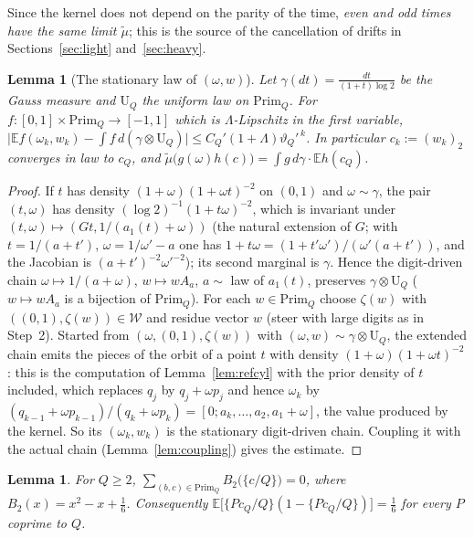\documentclass[11pt]{amsart}
\newtheorem{lemma}[theorem]{Lemma}
\theoremstyle{definition}
\numberwithin{equation}{section}
\newcommand{\E}{\mathbb{E}}
\newcommand{\cW}{\mathcal{W}}
\newcommand{\fr}[1]{\{#1\}}
\newcommand{\Prim}{\mathrm{Prim}}
\begin{document}
Since the kernel does not depend on the parity of the time, \emph{even and odd times have the same limit $\tilde\mu$}; this is the source of
the cancellation of drifts in Sections~\ref{sec:light} and~\ref{sec:heavy}.

\begin{lemma}[The stationary law of $(\omega,w)$]\label{lem:statlaw}
Let $\gamma(dt)=\frac{dt}{(1+t)\log2}$ be the Gauss measure and $\mathrm U_Q$ the uniform law on $\Prim_Q$. For $f:[0,1]\times\Prim_Q\to[-1,1]$
which is $\Lambda$-Lipschitz in the first variable,
$\big|\E f(\omega_k,w_k)-\int f\,d(\gamma\otimes\mathrm U_Q)\big|\le C_Q'(1+\Lambda)\vartheta_Q'^{\,k}$. In particular $c_k:=(w_k)_2$ converges in law to
$c_Q$, and $\tilde\mu\big(g(\omega)h(c)\big)=\int g\,d\gamma\cdot\E h(c_Q)$.
\end{lemma}

\begin{proof}
If $t$ has density $(1+\omega)(1+\omega t)^{-2}$ on $(0,1)$ and $\omega\sim\gamma$, the pair $(t,\omega)$ has density
$(\log2)^{-1}(1+t\omega)^{-2}$, which is invariant under $(t,\omega)\mapsto(Gt,1/(a_1(t)+\omega))$ (the natural extension of $G$; with
$t=1/(a+t')$, $\omega=1/\omega'-a$ one has $1+t\omega=(1+t'\omega')/(\omega'(a+t'))$, and the Jacobian is $(a+t')^{-2}\omega'^{-2}$); its
second marginal is $\gamma$. Hence the digit-driven chain $\omega\mapsto1/(a+\omega)$, $w\mapsto wA_a$, $a\sim$ law of $a_1(t)$, preserves
$\gamma\otimes\mathrm U_Q$ ($w\mapsto wA_a$ is a bijection of $\Prim_Q$). For each $w\in\Prim_Q$ choose $\zeta(w)$ with $((0,1),\zeta(w))\in\cW$
and residue vector $w$ (steer with large digits as in Step~2). Started from $(\omega,(0,1),\zeta(w))$ with $(\omega,w)\sim\gamma\otimes\mathrm U_Q$,
the extended chain emits the pieces of the orbit of a point $t$ with density $(1+\omega)(1+\omega t)^{-2}$: this is the computation of
Lemma~\ref{lem:refcyl} with the prior density of $t$ included, which replaces $q_j$ by $q_j+\omega p_j$ and hence $\omega_k$ by
$(q_{k-1}+\omega p_{k-1})/(q_k+\omega p_k)=[0;a_k,\dots,a_2,a_1+\omega]$, the value produced by the kernel. So its $(\omega_k,w_k)$ is the stationary
digit-driven chain. Coupling it with the actual chain (Lemma~\ref{lem:coupling}) gives the estimate.
\end{proof}

\begin{lemma}\label{lem:moebius}
For $Q\ge2$, $\sum_{(b,c)\in\Prim_Q}B_2\big(\fr{c/Q}\big)=0$, where $B_2(x)=x^2-x+\frac16$. Consequently $\E\big[\fr{Pc_Q/Q}(1-\fr{Pc_Q/Q})\big]=\frac16$ for
every $P$ coprime to $Q$.
\end{lemma}
\end{document}
